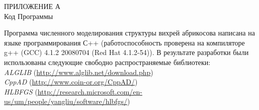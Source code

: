 \label{ch:A}
\begin{center}
    ПРИЛОЖЕНИЕ А\\
    Код Программы
\end{center}

Программа численного моделирования структуры вихрей абрикосова написана на 
языке программирования С++ (работоспособность проверена на компиляторе g++ 
(GCC) 4.1.2 20080704 (Red Hat 4.1.2-54)). В результате разработки были 
использованы следующие свободно распространяемые библиотеки: \\
\emph{ALGLIB} (\url{http://www.alglib.net/download.php}) \\
\emph{CppAD} (\url{http://www.coin-or.org/CppAD/}) \\
\emph{HLBFGS} 
(\url{http://research.microsoft.com/en-us/um/people/yangliu/software/hlbfgs/})

\newpage

